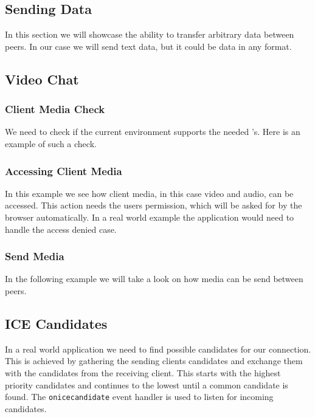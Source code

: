 \subsection{Sending Data}
In this section we will showcase the ability to transfer arbitrary data between peers. In our case we will send text data, but it could be data in any format.



\clearpage
\subsection{Video Chat}

\subsubsection{Client Media Check}
We need to check if the current environment supports the needed 's. Here is an example of such a check.


\subsubsection{Accessing Client Media}
In this example we see how client media, in this case video and audio, can be accessed. This action needs the users permission, which will be asked for by the browser automatically. In a real world example the application would need to handle the access denied case.



\clearpage
\subsubsection{Send Media}
In the following example we will take a look on how media can be send between peers.



\clearpage
\subsection{ICE Candidates}
In a real world application we need to find possible  candidates for our connection. This is achieved by gathering the sending clients  candidates and exchange them with the  candidates from the receiving client. This starts with the highest priority candidates and continues to the lowest until a common candidate is found. The \lstinline[basicstyle=\ttfamily\color{black}]|onicecandidate| event handler is used to listen for incoming  candidates.

